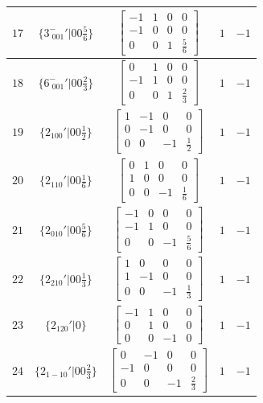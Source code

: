 \documentclass[fleqn,8pt]{jsarticle}
\begin{document}
\begin{longtable}{ccccc}
$ 17 $ & $ \{3^{-}_{\,\,001}{}'|0 0 \frac{5}{6}\} $ & $ \begin{bmatrix} -1 & 1 & 0 & 0 \\ -1 & 0 & 0 & 0 \\ 0 & 0 & 1 & \frac{5}{6} \end{bmatrix} $ & $ 1 $ & $ -1 $ \\ \hline
$ 18 $ & $ \{6^{-}_{\,\,001}{}'|0 0 \frac{2}{3}\} $ & $ \begin{bmatrix} 0 & 1 & 0 & 0 \\ -1 & 1 & 0 & 0 \\ 0 & 0 & 1 & \frac{2}{3} \end{bmatrix} $ & $ 1 $ & $ -1 $ \\ \hline
$ 19 $ & $ \{2{}_{100}{}'|0 0 \frac{1}{2}\} $ & $ \begin{bmatrix} 1 & -1 & 0 & 0 \\ 0 & -1 & 0 & 0 \\ 0 & 0 & -1 & \frac{1}{2} \end{bmatrix} $ & $ 1 $ & $ -1 $ \\ \hline
$ 20 $ & $ \{2{}_{110}{}'|0 0 \frac{1}{6}\} $ & $ \begin{bmatrix} 0 & 1 & 0 & 0 \\ 1 & 0 & 0 & 0 \\ 0 & 0 & -1 & \frac{1}{6} \end{bmatrix} $ & $ 1 $ & $ -1 $ \\ \hline
$ 21 $ & $ \{2{}_{010}{}'|0 0 \frac{5}{6}\} $ & $ \begin{bmatrix} -1 & 0 & 0 & 0 \\ -1 & 1 & 0 & 0 \\ 0 & 0 & -1 & \frac{5}{6} \end{bmatrix} $ & $ 1 $ & $ -1 $ \\ \hline
$ 22 $ & $ \{2{}_{210}{}'|0 0 \frac{1}{3}\} $ & $ \begin{bmatrix} 1 & 0 & 0 & 0 \\ 1 & -1 & 0 & 0 \\ 0 & 0 & -1 & \frac{1}{3} \end{bmatrix} $ & $ 1 $ & $ -1 $ \\ \hline
$ 23 $ & $ \{2{}_{120}{}'|0\} $ & $ \begin{bmatrix} -1 & 1 & 0 & 0 \\ 0 & 1 & 0 & 0 \\ 0 & 0 & -1 & 0 \end{bmatrix} $ & $ 1 $ & $ -1 $ \\ \hline
$ 24 $ & $ \{2{}_{1-10}{}'|0 0 \frac{2}{3}\} $ & $ \begin{bmatrix} 0 & -1 & 0 & 0 \\ -1 & 0 & 0 & 0 \\ 0 & 0 & -1 & \frac{2}{3} \end{bmatrix} $ & $ 1 $ & $ -1 $ \\
\end{longtable}
\end{document}
